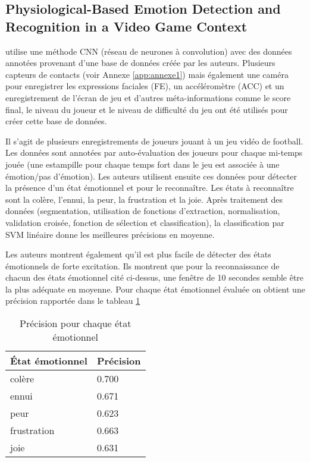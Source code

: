 \documentclass{article}
\begin{document}
    \subsection{Physiological-Based Emotion Detection and Recognition in a Video Game Context}
        \cite{yang_et_al._2018} utilise une méthode CNN (réseau de neurones à convolution) avec des données annotées provenant d’une base de données créée par les auteurs. Plusieurs capteurs de contacts (voir Annexe \ref{app:annexe1}) mais également une caméra pour enregistrer les expressions faciales (FE), un accéléromètre (ACC) et un enregistrement de l’écran de jeu et d’autres méta-informations comme le score final, le niveau du joueur et le niveau de difficulté du jeu ont été utilisés pour créer cette base de données.\par
        Il s’agit de plusieurs enregistrements de joueurs jouant à un jeu vidéo de football. 
        Les données sont annotées par auto-évaluation des joueurs pour chaque mi-temps jouée (une estampille pour chaque temps fort dans le jeu est associée à une émotion/pas d’émotion). 
        Les auteurs utilisent ensuite ces données pour détecter la présence d’un état émotionnel et pour le reconnaître. 
        Les états à reconnaître sont  la colère, l’ennui, la peur, la frustration et la joie. 
        Après traitement des données (segmentation, utilisation de fonctions d’extraction, normalisation, validation croisée, fonction de sélection et classification), la classification par SVM linéaire donne les meilleures précisions en moyenne.\par
        Les auteurs montrent également qu’il est plus facile de détecter des états émotionnels de forte excitation. 
        Ils montrent que pour la reconnaissance de chacun des états émotionnel cité ci-dessus, une fenêtre de 10 secondes semble être la plus adéquate en moyenne. Pour chaque état émotionnel évaluée on obtient une précision rapportée dans le tableau  \ref{tab:yangetal2018}
        \begin{table}
            \centering
            \begin{tabular}{l|l}
                \hline
                État émotionnel & Précision \\ \hline
                colère & 0.700 \\ \hline
                ennui & 0.671\\ \hline
                peur & 0.623\\ \hline
                frustration & 0.663\\ \hline
                joie & 0.631\\ \hline
            \end{tabular}
            \caption{Précision pour chaque état émotionnel}
            \label{tab:yangetal2018}
        \end{table}
\end{document}
